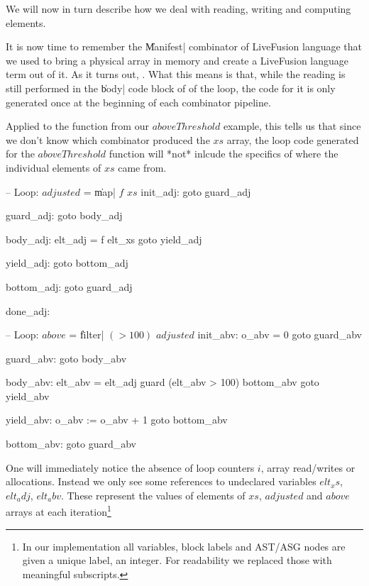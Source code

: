 \documentclass[preamble.tex]{subfiles}
\begin{document}
We will now in turn describe how we deal with reading, writing and computing elements.


It is now time to remember the \|Manifest| combinator of LiveFusion language that we used to bring a physical array in memory and create a LiveFusion language term out of it. As it turns out, . What this means is that, while the reading is still performed in the \|body| code block of of the loop, the code for it is only generated once at the beginning of each combinator pipeline.

Applied to the function from our $aboveThreshold$ example, this tells us that since we don't know which combinator produced the $xs$ array, the loop code generated for the $aboveThreshold$ function will *not* inlcude the specifics of where the individual elements of $xs$ came from.

\begin{loopcode}
  -- Loop: $adjusted$ = \|map| $f$ $xs$
  init_adj:
    goto guard_adj

  guard_adj:
    goto body_adj

  body_adj:
    elt_adj = f elt_xs
    goto yield_adj

  yield_adj:
    goto bottom_adj

  bottom_adj:
    goto guard_adj

  done_adj:


  -- Loop: $above$ = \|filter| $(>100)$ $adjusted$
  init_abv:
    o_abv = 0
    goto guard_abv

  guard_abv:
    goto body_abv

  body_abv:
    elt_abv = elt_adj
    guard (elt_abv > 100) bottom_abv
    goto yield_abv

  yield_abv:
    o_abv := o_abv + 1
    goto bottom_abv

  bottom_abv:
    goto guard_abv
\end{loopcode}

One will immediately notice the absence of loop counters $i$, array read/writes or allocations. Instead we only see some references to undeclared variables $elt_xs$, $elt_adj$, $elt_abv$. These represent the values of elements of $xs$, $adjusted$ and $above$ arrays at each iteration\footnote{In our implementation all variables, block labels and AST/ASG nodes are given a unique label, an integer. For readability we replaced those with meaningful subscripts.}
\end{document}
